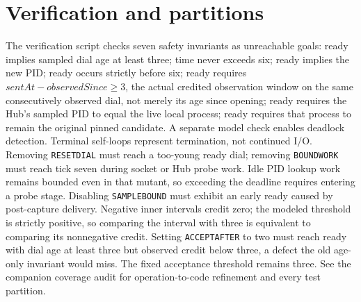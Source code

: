 \documentclass[a4paper,10pt,fleqn]{article}
\begin{document}
\section{Verification and partitions}
The verification script checks seven safety invariants as unreachable goals:
ready implies sampled dial age at least three; time never exceeds six;
ready implies the new PID; ready occurs strictly before six; ready requires
\(sentAt - observedSince \geq 3\), the actual credited observation window on
the same consecutively observed dial, not merely its age since opening;
ready requires the Hub's sampled PID to equal the live local process;
ready requires that process to remain the original pinned candidate.
A separate model
check enables deadlock detection. Terminal self-loops represent termination, not
continued I/O. Removing \texttt{RESETDIAL} must reach a too-young ready dial;
removing \texttt{BOUNDWORK} must reach tick seven during socket or Hub probe
work. Idle PID lookup work remains bounded even in that mutant, so exceeding
the deadline requires entering a probe stage. Disabling \texttt{SAMPLEBOUND}
must exhibit an early ready caused by post-capture delivery. Negative inner
intervals credit zero; the modeled threshold is strictly positive, so comparing
the interval with three is equivalent to comparing its nonnegative credit.
Setting \texttt{ACCEPTAFTER} to two must reach ready with dial age at least
three but observed credit below three, a defect the old age-only invariant
would miss. The fixed acceptance threshold remains three.
See the companion coverage
audit for operation-to-code refinement and every test partition.
\end{document}
